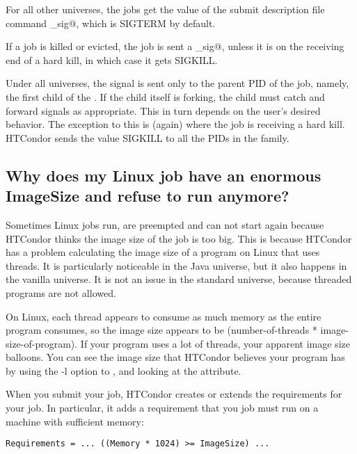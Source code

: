 For all other universes, the jobs get the value of
the submit description file command
\verb@kill_sig@, which is SIGTERM by default.

If a job is killed or evicted, the job is sent a
\verb@kill_sig@, 
unless it is on the receiving end of a hard kill,
in which case it gets SIGKILL.

Under all universes,
the signal is sent only to the parent PID of the job,
namely, the first child of the .
If the child itself is forking,
the child must catch and forward signals as appropriate.
This in turn depends on the user's desired behavior.
The exception to this is (again) where the job is receiving
a hard kill.
HTCondor sends the value SIGKILL to all the PIDs in the family.

\subsection*{Why does my Linux job have an enormous ImageSize and
refuse to run anymore?}


Sometimes Linux jobs run, are preempted and can not start again because
HTCondor thinks the image size of the job is too big. This is because
HTCondor has a problem calculating the image size of a program on Linux
that uses threads. It is particularly noticeable in the Java universe,
but it also happens in the vanilla universe. It is not an issue in the
standard universe, because threaded programs are not allowed.

On Linux, each thread appears to consume as much memory as the entire
program consumes, so the image size appears to be (number-of-threads *
image-size-of-program). If your program uses a lot of threads, your
apparent image size balloons. You can see the image size that HTCondor
believes your program has by using the -l option to , and
looking at the  attribute.

When you submit your job, HTCondor creates or extends the requirements
for your job. In particular, it adds a requirement that you job must
run on a machine with sufficient memory:

\footnotesize
\begin{verbatim}
Requirements = ... ((Memory * 1024) >= ImageSize) ...
\end{verbatim}
\normalsize

